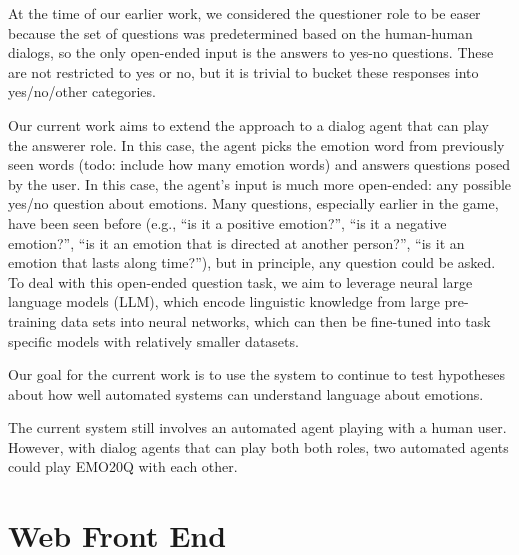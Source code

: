 \documentclass[conference]{IEEEtran}
\begin{document}
At the time of our earlier
work, we considered the questioner role to be easer because the set of
questions was predetermined based on the human-human dialogs, so the
only open-ended input is the answers to yes-no questions.  These are
not restricted to yes or no, but it is trivial to bucket these
responses into yes/no/other categories.

Our current work aims to extend the approach to a dialog agent that
can play the answerer role. In this case, the agent picks the emotion
word from previously seen words (todo: include how many emotion words)
and answers questions posed by the user. In this case, the agent's
input is much more open-ended: any possible yes/no question about
emotions.  Many questions, especially earlier in the game, have been
seen before (e.g., ``is it a positive emotion?'', ``is it a negative
emotion?'', ``is it an emotion that is directed at another person?'',
``is it an emotion that lasts along time?''), but in principle, any
question could be asked.  To deal with this open-ended question task,
we aim to leverage neural large language models (LLM), which encode
linguistic knowledge from large pre-training data sets into neural
networks, which can then be fine-tuned into task specific models with
relatively smaller datasets.


Our goal for the current work is to use the system to continue to test
hypotheses about how well automated systems can understand language
about emotions.

The current system still involves an automated agent
playing with a human user.  However, with dialog agents that can play
both both roles, two automated agents could play EMO20Q with each
other.





\section{Web Front End}
\end{document}
